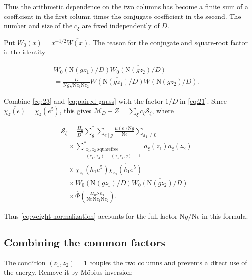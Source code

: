 \documentclass[reqno,a4paper,11pt]{amsart}
\begin{document}
Thus the arithmetic dependence on the two columns has become a finite sum of a coefficient in the first column times the conjugate coefficient in the second. The number and size of the $c_\xi$ are fixed independently of $D$.

Put $W_0(x)=x^{-1/2}\overline{W(x)}$. The reason for the conjugate and square-root factor is the identity

\begin{equation}\label{eq:weight-normalization}
\begin{gathered}
W_0(\mathrm{N}(gz_1)/D)\overline{W_0(\mathrm{N}(gz_2)/D)} \\ =\frac{D}{\mathrm{N}g\sqrt{\mathrm{N}z_1\mathrm{N}z_2}}\overline{W(\mathrm{N}(gz_1)/D)}W(\mathrm{N}(gz_2)/D).
\end{gathered}
\end{equation}

Combine \eqref{eq:23} and \eqref{eq:paired-gauss} with the factor $1/D$ in \eqref{eq:21}. Since $\overline{\chi_z(e)}=\chi_z(e^5)$, this gives $\mathcal{M}_D-Z=\sum_\xi c_\xi\mathcal{S}_\xi$, where

\begin{equation}\label{eq:first-dual}
\begin{gathered}
\mathcal{S}_\xi=\frac{H_0}{D^2}\sum_g^*\sum_{e\mid g}\frac{\mu(e)\mathrm{N}g}{\mathrm{N}e}\sum_{h_1\ne0} \\ \quad\times\sum_{\substack{z_1,z_2\;\mathrm{squarefree}\\(z_1,z_2)=(z_1z_2,g)=1}}^*a_\xi(z_1)\overline{a_\xi(z_2)} \\ \quad\times\chi_{z_1}(h_1e^5)\overline{\chi_{z_2}(h_1e^5)} \\ \quad\times W_0(\mathrm{N}(gz_1)/D)\overline{W_0(\mathrm{N}(gz_2)/D)} \\ \quad\times\widehat{\Phi}\left(\frac{H_0\mathrm{N}h_1}{\mathrm{N}e\,\mathrm{N}z_1\mathrm{N}z_2}\right).
\end{gathered}
\end{equation}

Thus \eqref{eq:weight-normalization} accounts for the full factor $\mathrm{N}g/\mathrm{N}e$ in this formula.

\subsection*{Combining the common factors}

The condition $(z_1,z_2)=1$ couples the two columns and prevents a direct use of the energy. Remove it by Möbius inversion:
\end{document}
